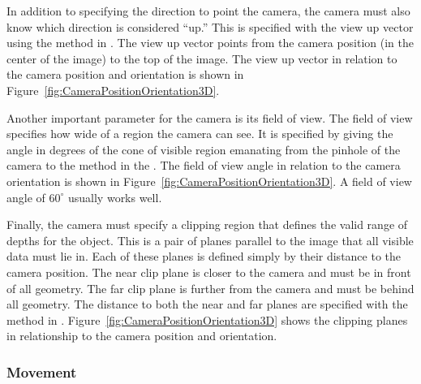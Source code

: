 
In addition to specifying the direction to point the camera, the camera
must also know which direction is considered ``up.'' This is specified with
the view up vector using the  method in
. The view up vector points from the camera position
(in the center of the image) to the top of the image. The view up vector in
relation to the camera position and orientation is shown in
Figure~\ref{fig:CameraPositionOrientation3D}.


Another important parameter for the camera is its field of view. The field
of view specifies how wide of a region the camera can see. It is specified
by giving the angle in degrees of the cone of visible region emanating from
the pinhole of the camera to the  method in the
. The field of view angle in relation to the camera
orientation is shown in Figure~\ref{fig:CameraPositionOrientation3D}. A
field of view angle of $60^{\circ}$ usually works well.


Finally, the camera must specify a clipping region that defines the valid
range of depths for the object. This is a pair of planes parallel to the
image that all visible data must lie in. Each of these planes is defined
simply by their distance to the camera position. The near clip plane is
closer to the camera and must be in front of all geometry. The far clip
plane is further from the camera and must be behind all geometry. The
distance to both the near and far planes are specified with the
 method in .
Figure~\ref{fig:CameraPositionOrientation3D} shows the clipping planes in
relationship to the camera position and orientation.


\subsubsection{Movement}

